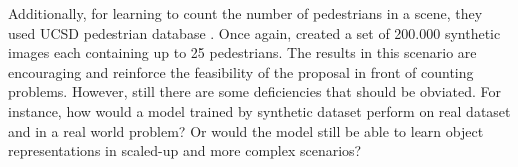 Additionally, for learning to count the number of pedestrians in a scene, they used UCSD pedestrian database \cite{chan2008privacy}. Once again, \citet{segui2015learning} created a set of 200.000 synthetic images each containing up to 25 pedestrians. The results in this scenario are encouraging and reinforce the feasibility of the proposal in front of counting problems. However, still there are some deficiencies that should be obviated. For instance, how would a model trained by synthetic dataset perform on real dataset and in a real world problem? Or would the model still be able to learn object representations in scaled-up and more complex scenarios?





